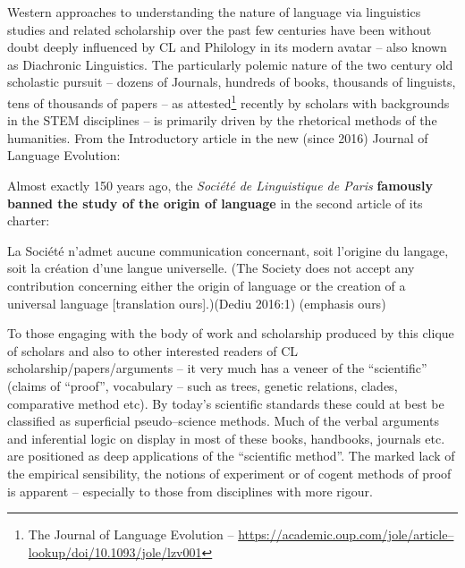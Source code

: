 \vskip 6pt

Western approaches to understanding the nature of language via linguistics studies and related scholarship over the past few centuries have been without doubt deeply influenced by CL and Philology in its modern avatar – also known as Diachronic Linguistics. The particularly polemic nature of the two century old scholastic pursuit – dozens of Journals, hundreds of books, thousands of linguists, tens of thousands of papers – as attested\footnote{The Journal of Language Evolution – \url{https://academic.oup.com/jole/article–lookup/doi/10.1093/jole/lzv001}} recently by scholars with backgrounds in the STEM disciplines – is primarily driven by the rhetorical methods of the humanities. From the Introductory article in the new (since 2016) Journal of Language Evolution:

\vskip 2pt

\begin{myquote}
Almost exactly 150 years ago, the \textit{Société de Linguistique de Paris} \textbf{famously banned the study of the origin of language} in the second article of its charter:
\end{myquote}

\vskip 2pt

\begin{myquote}
La Société n’admet aucune communication concernant, soit l’origine du langage, soit la création d’une langue universelle. (The Society does not accept any contribution concerning either the origin of language or the creation of a universal language [translation ours].)(Dediu 2016:1) (emphasis ours)
\end{myquote}

\vskip 3pt

To those engaging with the body of work and scholarship produced by this clique of scholars and also to other interested readers of CL scholarship/papers/arguments – it very much has a veneer of the “scientific” (claims of “proof”, vocabulary – such as trees, genetic relations, clades, comparative method etc). By today’s scientific standards these could at best be classified as superficial pseudo–science methods. Much of the verbal arguments and inferential logic on display in most of these books, handbooks, journals etc. are positioned as deep applications of the “scientific method”. The marked lack of the empirical sensibility, the notions of experiment or of cogent methods of proof is apparent – especially to those from disciplines with more rigour.

